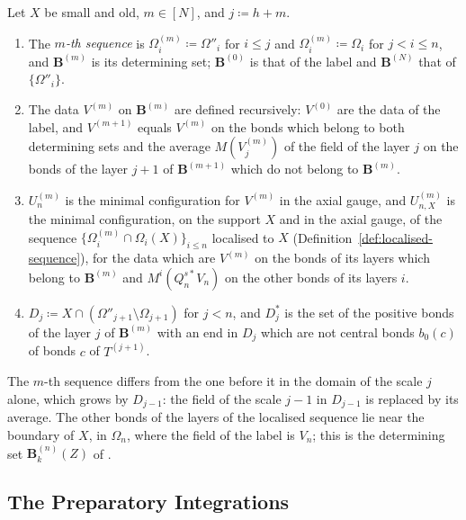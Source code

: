 \documentclass[11pt]{preprint}
\numberwithin{equation}{section}
\begin{document}
\begin{definition}\label{def:successive-sequences}
Let $X$ be small and old, $m \in [N]$, and $j \coloneqq h + m$.
\begin{enumerate}[label=(\roman*)]
\item The \emph{$m$-th sequence} is $\Omega^{(m)}_i \coloneqq \Omega''_i$ for $i \leqslant j$ and $\Omega^{(m)}_i \coloneqq \Omega_i$ for $j < i \leqslant n$, and $\mathbf B^{(m)}$ is its determining set; $\mathbf B^{(0)}$ is that of the label and $\mathbf B^{(N)}$ that of $\{ \Omega''_i \}$.
\item The data $V^{(m)}$ on $\mathbf B^{(m)}$ are defined recursively: $V^{(0)}$ are the data of the label, and $V^{(m+1)}$ equals $V^{(m)}$ on the bonds which belong to both determining sets and the average $M(V^{(m)}_j)$ of the field of the layer $j$ on the bonds of the layer $j + 1$ of $\mathbf B^{(m+1)}$ which do not belong to $\mathbf B^{(m)}$.
\item $U^{(m)}_n$ is the minimal configuration for $V^{(m)}$ in the axial gauge, and $U^{(m)}_{n,X}$ is the minimal configuration, on the support $X$ and in the axial gauge, of the sequence $\{ \Omega^{(m)}_i \cap \Omega_i(X) \}_{i \leqslant n}$ localised to $X$ (Definition~\ref{def:localised-sequence}), for the data which are $V^{(m)}$ on the bonds of its layers which belong to $\mathbf B^{(m)}$ and $M^i(Q^{s*}_nV_n)$ on the other bonds of its layers $i$.
\item $D_j \coloneqq X \cap (\Omega''_{j+1} \setminus \Omega_{j+1})$ for $j < n$, and $D^*_j$ is the set of the positive bonds of the layer $j$ of $\mathbf B^{(m)}$ with an end in $D_j$ which are not central bonds $b_0(c)$ of bonds $c$ of $T^{(j+1)}$.
\end{enumerate}
\end{definition}

The $m$-th sequence differs from the one before it in the domain of the scale $j$ alone, which grows by $D_{j-1}$: the field of the scale $j - 1$ in $D_{j-1}$ is replaced by its average. The other bonds of the layers of the localised sequence lie near the boundary of $X$, in $\Omega_n$, where the field of the label is $V_n$; this is the determining set $\mathbf B^{(n)}_k(Z)$ of \cite[(1.19), (1.20)]{BalabanLFR1}.

\subsection{The Preparatory Integrations}\label{sec:preparatory}
\end{document}
